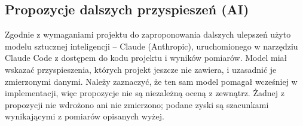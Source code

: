 \documentclass[12pt,a4paper]{article}
\begin{document}
\subsection{Propozycje dalszych przyspieszeń (AI)}
\label{sec:ai}

Zgodnie z wymaganiami projektu do zaproponowania dalszych ulepszeń użyto modelu sztucznej inteligencji -- Claude (Anthropic), uruchomionego w narzędziu Claude Code z dostępem do kodu projektu i wyników pomiarów. Model miał wskazać przyspieszenia, których projekt jeszcze nie zawiera, i uzasadnić je zmierzonymi danymi. Należy zaznaczyć, że ten sam model pomagał wcześniej w implementacji, więc propozycje nie są niezależną oceną z zewnątrz. Żadnej z propozycji nie wdrożono ani nie zmierzono; podane zyski są szacunkami wynikającymi z pomiarów opisanych wyżej.
\end{document}
